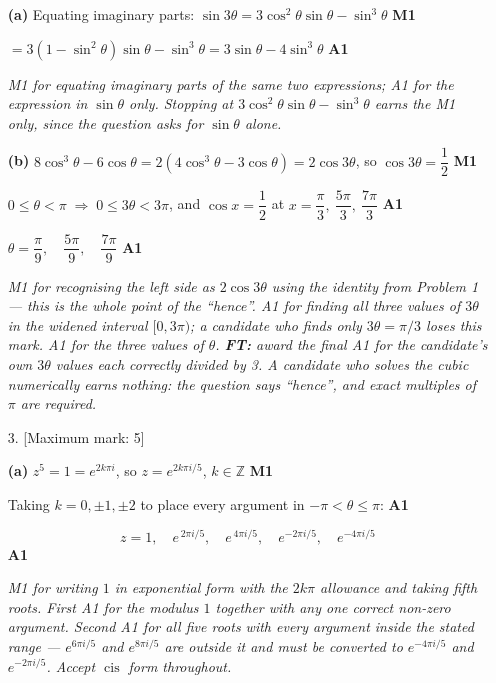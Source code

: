 \documentclass[12pt, twoside]{article}
\begin{document}
\begin{enumerate}[itemsep=0.3cm]
\textbf{(a)} Equating imaginary parts:
$\sin 3\theta = 3\cos^{2}\theta\sin\theta - \sin^{3}\theta$ \hfill \textbf{M1}

$= 3(1 - \sin^{2}\theta)\sin\theta - \sin^{3}\theta
= 3\sin\theta - 4\sin^{3}\theta$ \hfill \textbf{A1}

\emph{M1 for equating imaginary parts of the same two expressions; A1 for the
expression in $\sin\theta$ only. Stopping at
$3\cos^{2}\theta\sin\theta - \sin^{3}\theta$ earns the M1 only, since the
question asks for $\sin\theta$ alone.}

\textbf{(b)} $8\cos^{3}\theta - 6\cos\theta = 2(4\cos^{3}\theta - 3\cos\theta)
= 2\cos 3\theta$, so $\cos 3\theta = \dfrac{1}{2}$ \hfill \textbf{M1}

$0 \leq \theta < \pi \;\Rightarrow\; 0 \leq 3\theta < 3\pi$, and
$\cos x = \dfrac{1}{2}$ at $x = \dfrac{\pi}{3},\ \dfrac{5\pi}{3},\ \dfrac{7\pi}{3}$
\hfill \textbf{A1}

$\theta = \dfrac{\pi}{9},\quad \dfrac{5\pi}{9},\quad \dfrac{7\pi}{9}$
\hfill \textbf{A1}

\emph{M1 for recognising the left side as $2\cos 3\theta$ using the identity
from Problem 1 --- this is the whole point of the ``hence''. A1 for finding all
three values of $3\theta$ in the widened interval $[0, 3\pi)$; a candidate who
finds only $3\theta = \pi/3$ loses this mark. A1 for the three values of
$\theta$. \textbf{FT:} award the final A1 for the candidate's own $3\theta$
values each correctly divided by 3. A candidate who solves the cubic
numerically earns nothing: the question says ``hence'', and exact multiples of
$\pi$ are required.}

\newpage

\item[3.] [Maximum mark: 5]

\textbf{(a)} $z^{5} = 1 = e^{2k\pi i}$, so
$z = e^{2k\pi i/5}$, $k \in \mathbb{Z}$ \hfill \textbf{M1}

Taking $k = 0, \pm 1, \pm 2$ to place every argument in
$-\pi < \theta \leq \pi$: \hfill \textbf{A1}

$$z = 1,\quad e^{\,2\pi i/5},\quad e^{\,4\pi i/5},\quad e^{-2\pi i/5},\quad
e^{-4\pi i/5}$$ \hfill \textbf{A1}

\emph{M1 for writing $1$ in exponential form with the $2k\pi$ allowance and
taking fifth roots. First A1 for the modulus $1$ together with any one correct
non-zero argument. Second A1 for all five roots with every argument inside the
stated range --- $e^{6\pi i/5}$ and $e^{8\pi i/5}$ are outside it and must be
converted to $e^{-4\pi i/5}$ and $e^{-2\pi i/5}$. Accept $\operatorname{cis}$
form throughout.}


\end{enumerate}
\end{document}
